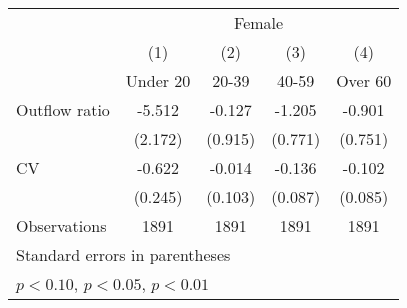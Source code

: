 \begin{tabular}{l*{4}{c}} \toprule
                    &\multicolumn{4}{c}{Female}                                                             \\\cmidrule(lr){2-5}
                    &\multicolumn{1}{c}{(1)}         &\multicolumn{1}{c}{(2)}         &\multicolumn{1}{c}{(3)}         &\multicolumn{1}{c}{(4)}         \\
                    &    Under 20         &       20-39         &       40-59         &     Over 60         \\
\midrule
Outflow ratio       &      -5.512\sym{**} &      -0.127         &      -1.205         &      -0.901         \\
                    &     (2.172)         &     (0.915)         &     (0.771)         &     (0.751)         \\
\addlinespace
CV                  &      -0.622\sym{**} &      -0.014         &      -0.136         &      -0.102         \\
                    &     (0.245)         &     (0.103)         &     (0.087)         &     (0.085)         \\
\hline
Observations        &        1891         &        1891         &        1891         &        1891         \\
\bottomrule \multicolumn{5}{l}{\footnotesize Standard errors in parentheses}\\ \multicolumn{5}{l}{\footnotesize \sym{*} \(p<0.10\), \sym{**} \(p<0.05\), \sym{***} \(p<0.01\)} \end{tabular}
